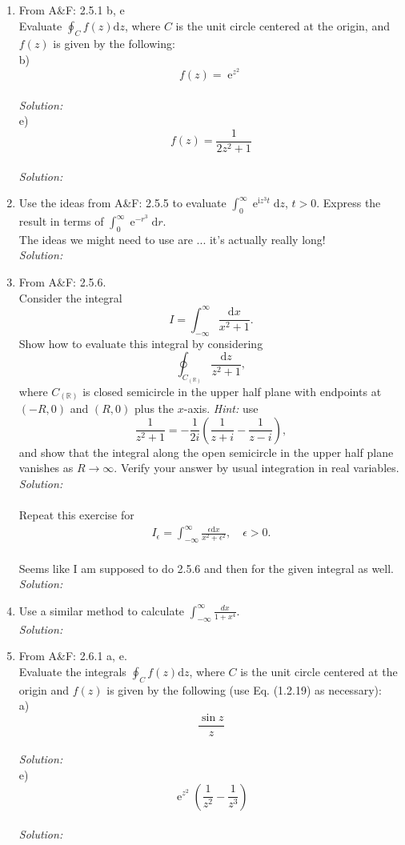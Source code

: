 \documentclass[10pt]{amsart}
\newcommand{\D}{\mathrm{d}}
\newcommand{\I}{\mathrm{i}}
\DeclareMathOperator{\E}{e}
\theoremstyle{nonumberplain}
\begin{document}
\begin{enumerate}[label={\bf {\arabic*}:}]
\item From A\&F: 2.5.1 b, e \\
Evaluate $\oint_C f(z)\D z$, where $C$ is the unit circle centered at the origin, and $f(z)$ is given by the following: \\
b) $$f(z) = \E^{z^2}$$ \\
\textit{Solution:} \\
e) $$f(z) = \frac{1}{2z^2 + 1} $$ \\
\textit{Solution:} \\
\item Use the ideas from A\&F: 2.5.5 to evaluate $\int_0^\infty \E^{\I
    z^3 t} \D z$, $t > 0$.  Express the result in terms of $\int_0^\infty \E^{-
    r^3} \D r$. \\
The ideas we might need to use are ... it's actually really long! \\
\textit{Solution:}\\
\item From A\&F: 2.5.6. \\
Consider the integral $$I = \int_{-\infty}^{\infty} \frac{\D x}{x^2 + 1}.$$
Show how to evaluate this integral by considering
$$\oint_{C_{(\mathbb R)}} \frac{\D z}{z^2 + 1},$$
where $C_{(\mathbb R)}$ is closed semicircle in the upper half plane with endpoints at $(-R, 0)$ and $(R, 0)$ plus the $x$-axis.
\textit{Hint:} use
$$\frac{1}{z^2 + 1} = -\frac{1}{2i}\left(\frac{1}{z + i} - \frac{1}{z - i}\right),$$
and show that the integral along the open semicircle in the upper half plane vanishes as $R \rightarrow \infty$.
Verify your answer by usual integration in real variables.
\textit{Solution:}\\
\\

\noindent
Repeat this exercise for
  \begin{align*}
    I_\epsilon = \int_{-\infty}^\infty \frac{\epsilon \D x}{x^2 +
    \epsilon^2}, \quad \epsilon > 0.
  \end{align*}\\
Seems like I am supposed to do 2.5.6 and then for the given integral as well. \\
\textit{Solution:}\\
\item Use a similar method to calculate
  $\int_{-\infty}^{\infty} \frac{d x}{1+x^4}$. \\
\textit{Solution:}\\

\item From A\&F: 2.6.1 a, e.\\
Evaluate the integrals $\oint_C f(z) \D z$, where $C$ is the unit circle centered at the origin and $f(z)$ is given by the following (use Eq. (1.2.19) as necessary): \\
a)
$$
\frac{\sin z}{z}
$$
\\
\textit{Solution:}\\
e)
$$
\E^{z^2}\left(\frac{1}{z^2} - \frac{1}{z^3}\right)
$$
\\
\textit{Solution:}\\
\end{enumerate}
\end{document}
